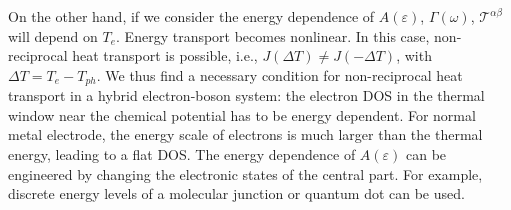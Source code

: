 \documentclass[aps
,twocolumn
,floatfix,footinbib,prl
]{revtex4-1}
\newcommand{\revision}[1]{{\color{blue}{#1}}}
\begin{document}
On the other hand, if we consider the energy dependence of $A(\varepsilon)$, $\Gamma(\omega)$, $\mathcal{T}^{\alpha\beta}$ will depend on $T_e$. Energy transport becomes nonlinear. In this case, non-reciprocal heat transport is possible, i.e., $J(\Delta T)\neq J(-\Delta T)$, with $\Delta T=T_e-T_{ph}$. We thus find a necessary condition for non-reciprocal heat transport in a hybrid electron-boson system: the electron DOS in the thermal window near the chemical potential has to be energy dependent\cite{zhang2013thermal,ren2013heat}. For normal metal electrode, the energy scale of electrons is much larger than the thermal energy, leading to a flat DOS. The energy dependence of $A(\varepsilon)$ can be engineered by changing the electronic states of the central part. For example, discrete energy levels of a molecular junction or quantum dot can be used. %
\end{document}
